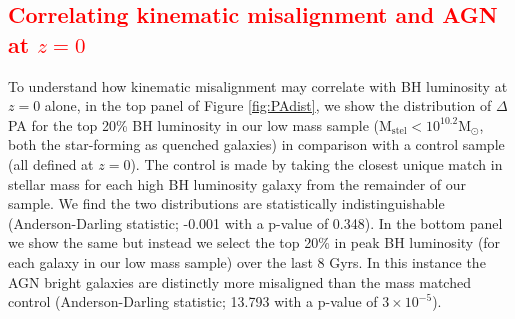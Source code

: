 \documentclass[fleqn,usenatbib]{mnras}
\newcommand{\red}[1]{{\textcolor{red}{#1}}}
\begin{document}


\subsection{\red{Correlating kinematic misalignment and AGN at $z=0$}}
To understand how kinematic misalignment may correlate with BH luminosity at $z=0$ alone, in the top panel of Figure \ref{fig:PAdist}, we show the distribution of $\Delta$PA for the top 20\% BH luminosity in our low mass sample ($\mathrm{M_{stel} < 10^{10.2}M_{\odot}}$, both the star-forming as quenched galaxies) in comparison with a control sample (all defined at $z=0$). The control is made by taking the closest unique match in stellar mass for each high BH luminosity galaxy from the remainder of our sample. We find the two distributions are statistically indistinguishable (Anderson-Darling statistic; -0.001 with a p-value of 0.348). In the bottom panel we show the same but instead we select the top 20\% in peak BH luminosity (for each galaxy in our low mass sample) over the last 8 Gyrs. In this instance the AGN bright galaxies are distinctly more misaligned than the mass matched control (Anderson-Darling statistic; 13.793 with a p-value of $3 \times 10^{-5}$). 
\end{document}
